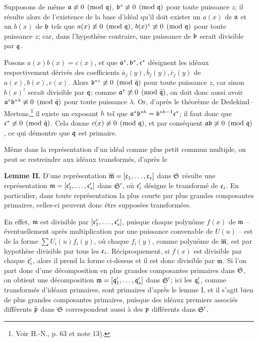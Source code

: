 Supposons de même $\mathfrak a\not\equiv0\pmod{\mathfrak q}$, $\mathfrak b^z\not\equiv0\pmod{\mathfrak q}$ pour toute puissance $z$; il résulte alors de l'existence de la base d'idéal qu'il doit exister un $a(x)$ de $\mathfrak a$ et un $b(x)$ de $\mathfrak b$ tels que $a(x)\not\equiv0\pmod{\mathfrak q}$, $b(x)^z\not\equiv0\pmod{\mathfrak q}$ pour toute puissance $z$; car, dans l'hypothèse contraire, une puissance de $\mathfrak b$ serait divisible par $\mathfrak q$.

Posons $a(x)b(x)=c(x)$, et que $\mathfrak a^*,\mathfrak b^*,\mathfrak c^*$ désignent les idéaux respectivement dérivés des coefficients $\bar a_j(y),\bar b_j(y),\bar c_j(y)$ de $a(x),b(x),c(x)$. Alors $\mathfrak b^{*z}\not\equiv0\pmod{\bar{\mathfrak q}}$ pour toute puissance $z$, car sinon $b(x)^z$ serait divisible par $\mathfrak q$; comme $\mathfrak a^*\not\equiv0\pmod{\bar{\mathfrak q}}$, on doit donc aussi avoir $\mathfrak a^*\mathfrak b^{*\lambda}\not\equiv0\pmod{\bar{\mathfrak q}}$ pour toute puissance $\lambda$. Or, d'après le théorème de Dedekind--Mertens,\footnote{Voir H.-N., p. 63 et note 13).} il existe un exposant $h$ tel que $\mathfrak a^*\mathfrak b^{*h}=\mathfrak b^{*h-1}\mathfrak c^*$; il faut donc que $\mathfrak c^*\not\equiv0\pmod{\bar{\mathfrak q}}$. Cela donne $c(x)\not\equiv0\pmod{\mathfrak q}$, et par conséquent $\mathfrak a\mathfrak b\not\equiv0\pmod{\mathfrak q}$, ce qui démontre que $\mathfrak q$ est primaire.

Même dans la représentation d'un idéal comme plus petit commun multiple, on peut se restreindre aux idéaux transformés, d'après le

\textbf{Lemme II.} D'une représentation $\overline{\mathfrak m}=[\mathfrak c_1,\ldots,\mathfrak c_s]$ dans $\mathfrak S$ résulte une représentation $\mathfrak m=[\mathfrak c_1',\ldots,\mathfrak c_s']$ dans $\mathfrak S'$, où $\mathfrak c_i'$ désigne le transformé de $\mathfrak c_i$. En particulier, dans toute représentation la plus courte par plus grandes composantes primaires, celles-ci peuvent donc être supposées transformées.

En effet, $\mathfrak m$ est divisible par $[\mathfrak c_1',\ldots,\mathfrak c_s']$, puisque chaque polynôme $f(x)$ de $\mathfrak m$ -- éventuellement après multiplication par une puissance convenable de $U(u)$ -- est de la forme $\sum U_i(u)f_i(y)$, où chaque $f_i(y)$, comme polynôme de $\overline{\mathfrak m}$, est par hypothèse divisible par tous les $\mathfrak c_i$. Réciproquement, si $f(x)$ est divisible par chaque $\mathfrak c_i'$, alors il prend la forme ci-dessus et il est donc divisible par $\mathfrak m$. Si l'on part donc d'une décomposition en plus grandes composantes primaires dans $\mathfrak S$, on obtient une décomposition $\mathfrak m=[\mathfrak q_1',\ldots,\mathfrak q_s']$ dans $\mathfrak S'$; ici les $\mathfrak q_i'$, comme transformés d'idéaux primaires, sont primaires d'après le lemme I, et il s'agit bien de plus grandes composantes primaires, puisque des idéaux premiers associés différents $\bar{\mathfrak p}$ dans $\mathfrak S$ correspondent aussi à des $\mathfrak p$ différents dans $\mathfrak S'$.


